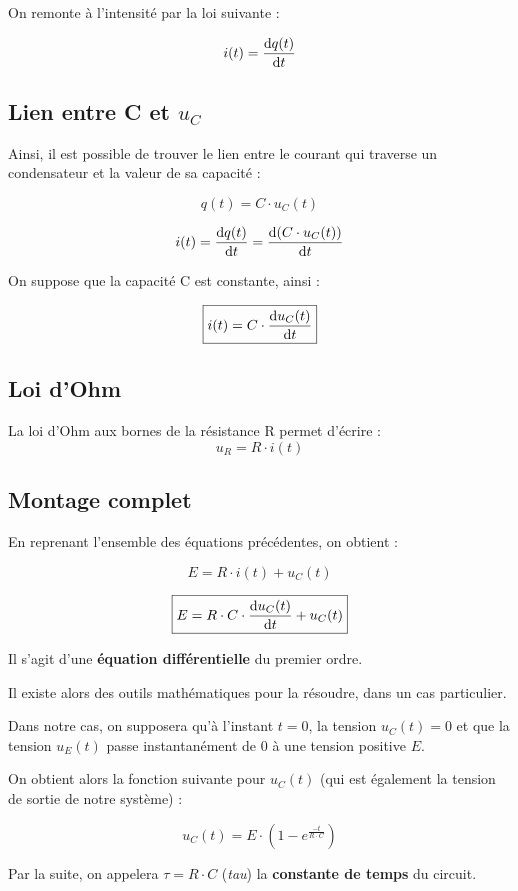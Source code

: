 \documentclass[11pt]{article} %
\begin{document}
On remonte à l'intensité par la loi suivante :

$$i(t) = \frac{{\rm d}q(t)}{{\rm d}t}$$


\subsection{Lien entre C et $u_C$}

Ainsi, il est possible de trouver le lien entre le courant qui traverse un condensateur et la valeur de sa capacité :

$$q(t) = C \cdot u_C(t)$$

$$i(t) = \frac{{\rm d}q(t)}{{\rm d}t} = \frac{{\rm d}(C \cdot u_C(t))}{{\rm d}t}$$

On suppose que la capacité C est constante, ainsi :

$$\boxed{i(t) = C \cdot \frac{{\rm d}u_C(t)}{{\rm d}t}}$$


\subsection{Loi d'Ohm}

La loi d'Ohm aux bornes de la résistance R permet d'écrire : $$\boxed{u_R = R \cdot i(t)}$$

\subsection{Montage complet}

En reprenant l'ensemble des équations précédentes, on obtient :

$$E = R \cdot i(t) + u_C(t)$$

$$\boxed{E = R \cdot C \cdot \frac{{\rm d}u_C(t)}{{\rm d}t} + u_C(t)}$$

Il s'agit d'une \textbf{équation différentielle} du premier ordre.

\medskip

Il existe alors des outils mathématiques pour la résoudre, dans un cas particulier.

Dans notre cas, on supposera qu'à l'instant $t=0$, la tension $u_C(t) = 0$ et que la tension $u_E(t)$ passe instantanément de 0 à une tension positive $E$.

On obtient alors la fonction suivante pour $u_C(t)$ (qui est également la tension de sortie de notre système) :

$$\boxed{u_C(t) = E \cdot (1 - e^{\frac{-t}{R \cdot C}})}$$

Par la suite, on appelera $\tau = R \cdot C$ (\textit{tau}) la \textbf{constante de temps} du circuit.
\end{document}
